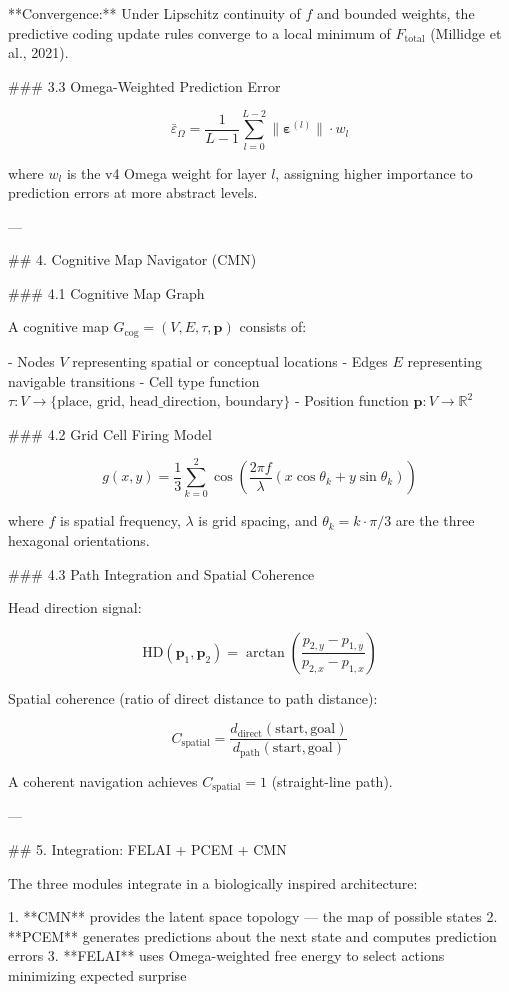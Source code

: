 **Convergence:** Under Lipschitz continuity of \( f \) and bounded weights, the predictive coding update rules converge to a local minimum of \( F_{\text{total}} \) (Millidge et al., 2021).

### 3.3 Omega-Weighted Prediction Error

\[
\bar{\varepsilon}_\Omega = \frac{1}{L-1} \sum_{l=0}^{L-2} \|\boldsymbol{\varepsilon}^{(l)}\| \cdot w_l
\]

where \( w_l \) is the v4 Omega weight for layer \( l \), assigning higher importance to prediction errors at more abstract levels.

---

## 4. Cognitive Map Navigator (CMN)

### 4.1 Cognitive Map Graph

A cognitive map \( G_{\text{cog}} = (V, E, \tau, \mathbf{p}) \) consists of:

- Nodes \( V \) representing spatial or conceptual locations
- Edges \( E \) representing navigable transitions
- Cell type function \( \tau: V \to \{\text{place, grid, head\_direction, boundary}\} \)
- Position function \( \mathbf{p}: V \to \mathbb{R}^2 \)

### 4.2 Grid Cell Firing Model

\[
g(x, y) = \frac{1}{3} \sum_{k=0}^{2} \cos\left(\frac{2\pi f}{\lambda} (x \cos\theta_k + y \sin\theta_k)\right)
\]

where \( f \) is spatial frequency, \( \lambda \) is grid spacing, and \( \theta_k = k \cdot \pi/3 \) are the three hexagonal orientations.

### 4.3 Path Integration and Spatial Coherence

Head direction signal:

\[
\text{HD}(\mathbf{p}_1, \mathbf{p}_2) = \arctan\left(\frac{p_{2,y} - p_{1,y}}{p_{2,x} - p_{1,x}}\right)
\]

Spatial coherence (ratio of direct distance to path distance):

\[
C_{\text{spatial}} = \frac{d_{\text{direct}}(\text{start}, \text{goal})}{d_{\text{path}}(\text{start}, \text{goal})}
\]

A coherent navigation achieves \( C_{\text{spatial}} = 1 \) (straight-line path).

---

## 5. Integration: FELAI + PCEM + CMN

The three modules integrate in a biologically inspired architecture:

1. **CMN** provides the latent space topology --- the map of possible states
2. **PCEM** generates predictions about the next state and computes prediction errors
3. **FELAI** uses Omega-weighted free energy to select actions minimizing expected surprise

